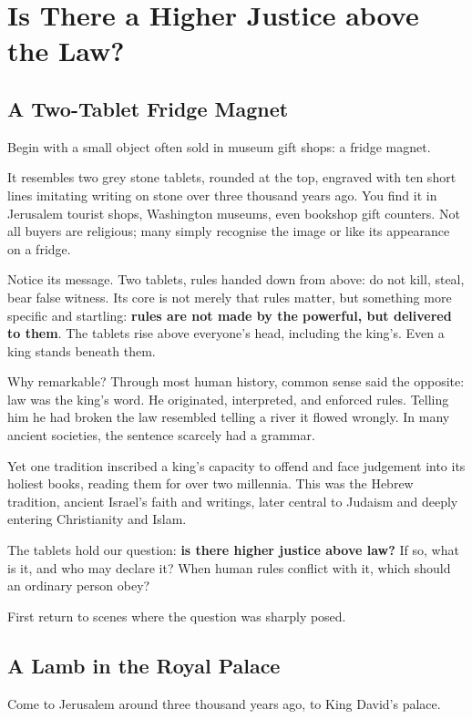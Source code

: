 \chapter[Justice above the Law?]{Is There a Higher Justice above the Law?}
\section{A Two-Tablet Fridge Magnet}
Begin with a small object often sold in museum gift shops: a fridge magnet.

It resembles two grey stone tablets, rounded at the top, engraved with ten short lines imitating writing on stone over three thousand years ago. You find it in Jerusalem tourist shops, Washington museums, even bookshop gift counters. Not all buyers are religious; many simply recognise the image or like its appearance on a fridge.

Notice its message. Two tablets, rules handed down from above: do not kill, steal, bear false witness. Its core is not merely that rules matter, but something more specific and startling: \textbf{rules are not made by the powerful, but delivered to them}. The tablets rise above everyone's head, including the king's. Even a king stands beneath them.

Why remarkable? Through most human history, common sense said the opposite: law was the king's word. He originated, interpreted, and enforced rules. Telling him he had broken the law resembled telling a river it flowed wrongly. In many ancient societies, the sentence scarcely had a grammar.

Yet one tradition inscribed a king's capacity to offend and face judgement into its holiest books, reading them for over two millennia. This was the Hebrew tradition, ancient Israel's faith and writings, later central to Judaism and deeply entering Christianity and Islam.

The tablets hold our question: \textbf{is there higher justice above law?} If so, what is it, and who may declare it? When human rules conflict with it, which should an ordinary person obey?

First return to scenes where the question was sharply posed.

\section{A Lamb in the Royal Palace}
Come to Jerusalem around three thousand years ago, to King David's palace.

